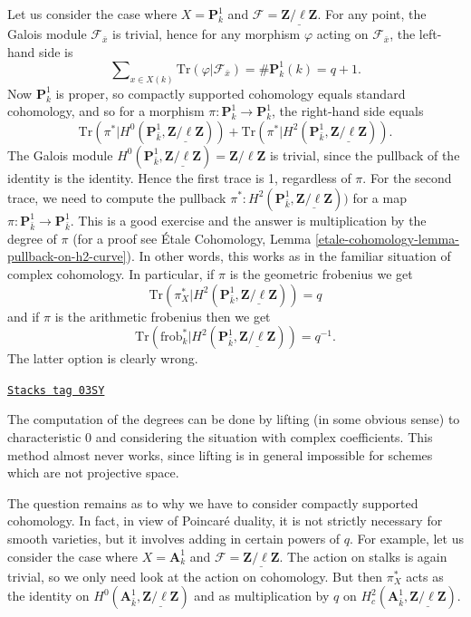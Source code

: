 \medskip\noindent
Let us consider the case where $X = \mathbf{P}^1_k$ and $\mathcal{F} =
\underline{\mathbf{Z}/\ell\mathbf{Z}}$. For any point, the Galois module
$\mathcal{F}_{\bar x}$ is trivial, hence for any morphism $\varphi$ acting on
$\mathcal{F}_{\bar x}$, the left-hand side is
$$
\sum\nolimits_{x \in X(k)} \text{Tr}(\varphi | \mathcal{F}_{\bar x}) =
\#\mathbf{P}^1_k(k) = q+1.
$$
Now $\mathbf{P}^1_k$ is proper, so compactly supported cohomology equals
standard cohomology, and so for a morphism $\pi : \mathbf{P}^1_k \to
\mathbf{P}^1_k$, the right-hand side equals
$$
\text{Tr}(\pi^* | H^0 (\mathbf{P}^1_{\bar k},
\underline{\mathbf{Z}/\ell\mathbf{Z}})) + \text{Tr}(\pi^* | H^2
(\mathbf{P}^1_{\bar k}, \underline{\mathbf{Z}/\ell\mathbf{Z}})).
$$
The Galois module $H^0 (\mathbf{P}^1_{\bar k},
\underline{\mathbf{Z}/\ell\mathbf{Z}}) = \mathbf{Z}/\ell\mathbf{Z}$ is trivial,
since the pullback of the identity is the identity. Hence the first trace is 1,
regardless of $\pi$. For the second trace, we need to compute the pullback
$\pi^* : H^2(\mathbf{P}^1_{\bar k}, \underline{\mathbf{Z}/\ell\mathbf{Z}}))$
for a map $\pi : \mathbf{P}^1_{\bar k} \to \mathbf{P}^1_{\bar k}$. This is a
good exercise and the answer is multiplication by the degree of $\pi$
(for a proof see
\'Etale Cohomology, Lemma \ref{etale-cohomology-lemma-pullback-on-h2-curve}).
In other words, this works as in the familiar situation of complex cohomology.
In particular, if $\pi$ is the geometric frobenius we get
$$
\text{Tr}(\pi_X^* | H^2 (\mathbf{P}^1_{\bar k},
\underline{\mathbf{Z}/\ell\mathbf{Z}})) = q
$$
and if $\pi$ is the arithmetic frobenius then we get
$$
\text{Tr}(\text{frob}_k^* | H^2 (\mathbf{P}^1_{\bar k},
\underline{\mathbf{Z}/\ell\mathbf{Z}})) = q^{-1}.
$$
The latter option is clearly wrong.

\begin{remark}
\label{trace-remark-compute-degree-lifting}
\href{https://stacks.math.columbia.edu/tag/03SY}{\texttt{Stacks tag 03SY}}

The computation of the degrees can be done by lifting (in some obvious sense)
to characteristic 0 and considering the situation with complex coefficients.
This method almost never works, since lifting is in general impossible for
schemes which are not projective space.
\end{remark}

The question remains as to why we have to consider compactly supported
cohomology. In fact, in view of Poincar\'e duality, it is not strictly
necessary for smooth varieties, but it involves adding in certain powers
of $q$. For example, let us consider the case where
$X = \mathbf{A}^1_k$ and
$\mathcal{F} = \underline{\mathbf{Z}/\ell\mathbf{Z}}$.
The action on stalks is again trivial, so we only need look at the action
on cohomology. But then $\pi_X^*$ acts as the identity on
$H^0(\mathbf{A}^1_{\bar k}, \underline{\mathbf{Z}/\ell\mathbf{Z}})$
and as multiplication by $q$ on
$H^2_c(\mathbf{A}^1_{\bar k}, \underline{\mathbf{Z}/\ell\mathbf{Z}})$.

